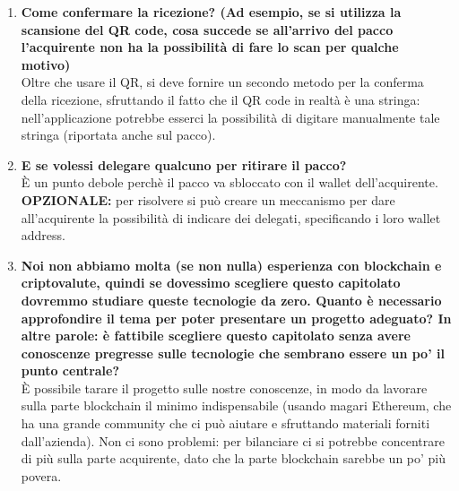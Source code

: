 \documentclass[11pt]{article}
\begin{document}
\begin{enumerate}
				\item \textbf{Come confermare la ricezione? (Ad esempio, se si utilizza la scansione del QR code, cosa succede se all’arrivo del pacco l’acquirente non ha la possibilità di fare lo scan per qualche motivo)}\\
				
				Oltre che usare il QR, si deve fornire un secondo metodo per la conferma della ricezione, sfruttando il fatto che il QR code in realtà è una stringa: nell’applicazione potrebbe esserci la possibilità di digitare manualmente tale stringa (riportata anche sul pacco).
				
				\item \textbf{E se volessi delegare qualcuno per ritirare il pacco?}\\
				
				È un punto debole perchè il pacco va sbloccato con il wallet dell’acquirente.\\
				\textbf{OPZIONALE:} per risolvere si può creare un meccanismo per dare all’acquirente la possibilità di indicare dei delegati, specificando i loro wallet address.
				
				\item \textbf{Noi non abbiamo molta (se non nulla) esperienza con blockchain e criptovalute, quindi se dovessimo scegliere questo capitolato dovremmo studiare queste tecnologie da zero. Quanto è necessario approfondire il tema per poter presentare un progetto adeguato? In altre parole: è fattibile scegliere questo capitolato senza avere conoscenze pregresse sulle tecnologie che sembrano essere un po’ il punto centrale?}\\
				
				È possibile tarare il progetto sulle nostre conoscenze, in modo da lavorare sulla parte blockchain il minimo indispensabile (usando magari Ethereum, che ha una grande community che ci può aiutare e sfruttando materiali forniti dall'azienda). Non ci sono problemi: per bilanciare ci si potrebbe concentrare di più sulla parte acquirente, dato che la parte blockchain sarebbe un po’ più povera.
			
			\end{enumerate}
			
			
		
			
			
			
			

	
\end{document}
